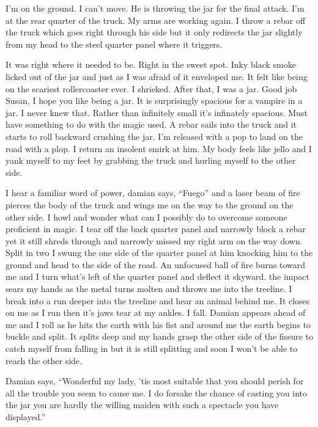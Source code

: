 I'm on the ground. I can't move. He is throwing the jar for the final attack. I'm at the rear quarter of the truck. My arms are working again. I throw a rebar off the truck which goes right through his side but it only redirects the jar slightly from my head to the steel quarter panel where it triggers.

It was right where it needed to be. Right in the sweet spot. Inky black smoke licked out of the jar and just as I was afraid of it enveloped me. It felt like being on the scariest rollercoaster ever. I shrieked. After that, I was a jar. Good job Susan, I hope you like being a jar. It is surprisingly spacious for a vampire in a jar. I never knew that. Rather than infinitely small it's infinately spacious. Must have something to do with the magic used. A rebar sails into the truck and it starts to roll backward crushing the jar. I'm released with a pop to land on the road with a plop. I return an insolent smirk at him. My body feels like jello and I yank myself to my feet by grabbing the truck and hurling myself to the other side.

I hear a familiar word of power, damian says, ``Fuego'' and a laser beam of fire pierces the body of the truck and wings me on the way to the ground on the other side. I howl and wonder what can I possibly do to overcome someone proficient in magic. I tear off the back quarter panel and narrowly block a rebar yet it still shreds through and narrowly missed my right arm on the way down. Split in two I swung the one side of the quarter panel at him knocking him to the ground and head to the side of the road. An unfocused ball of fire burns toward me and I turn what's left of the quarter panel and deflect it skyward. the impact sears my hands as the metal turns molten and throws me into the treeline. I break into a run deeper into the treeline and hear an animal behind me. It closes on me as I run then it's jaws tear at my ankles. I fall. Damian appears ahead of me and I roll as he hits the earth with his fist and around me the earth begins to buckle and split. It splits deep and my hands grasp the other side of the fissure to catch myself from falling in but it is still splitting and soon I won't be able to reach the other side.

Damian says, ``Wonderful my lady, 'tis most suitable that you should perish for all the trouble you seem to cause me. I do forsake the chance of casting you into the jar you are hardly the willing maiden with such a spectacle you have displayed.''

